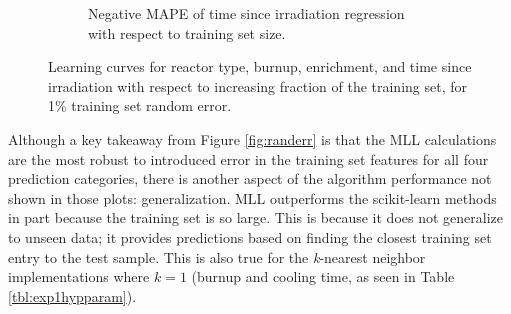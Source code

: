 \begin{figure}[!htb]
\begin{subfigure}[b]{0.49\textwidth}
    \caption{Negative \gls{MAPE} of time since irradiation regression with 
             respect to training set size.}
    \label{fig:learnsD01}
  \end{subfigure}
  \caption{Learning curves for reactor type, burnup, enrichment, and time 
           since irradiation with respect to increasing fraction of the 
           training set, for 1\% training set random error.}
  \label{fig:learns01}
\end{figure}


Although a key takeaway from Figure \ref{fig:randerr} is that the \gls{MLL}
calculations are the most robust to introduced error in the training set
features for all four prediction categories, there is another aspect of the
algorithm performance not shown in those plots: generalization. \Gls{MLL}
outperforms the scikit-learn methods in part because the training set is so
large. This is because it does not generalize to unseen data; it provides
predictions based on finding the closest training set entry to the test sample.
This is also true for the \textit{k}-nearest neighbor implementations where
$k=1$ (burnup and cooling time, as seen in Table \ref{tbl:exp1hypparam}).

